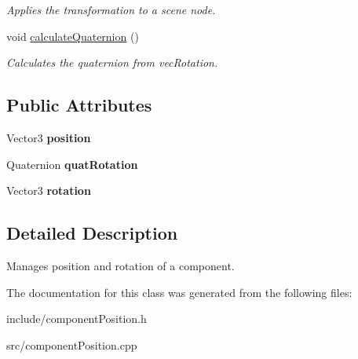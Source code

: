 \begin{DoxyCompactItemize}
\begin{DoxyCompactList}\small\item\em \-Applies the transformation to a scene node. \end{DoxyCompactList}\item 
\hypertarget{classComponentPosition_a76ad8432d80c73989f2fbb2df37777fc}{
void \hyperlink{classComponentPosition_a76ad8432d80c73989f2fbb2df37777fc}{calculate\-Quaternion} ()}
\label{d3/dbe/classComponentPosition_a76ad8432d80c73989f2fbb2df37777fc}

\begin{DoxyCompactList}\small\item\em \-Calculates the quaternion from vec\-Rotation. \end{DoxyCompactList}\end{DoxyCompactItemize}
\subsection*{\-Public \-Attributes}
\begin{DoxyCompactItemize}
\item 
\hypertarget{classComponentPosition_ae77f5516d6f620d89073689b21156b65}{
\-Vector3 {\bfseries position}}
\label{d3/dbe/classComponentPosition_ae77f5516d6f620d89073689b21156b65}

\item 
\hypertarget{classComponentPosition_a944964a54f7842fd674226946937cf84}{
\-Quaternion {\bfseries quat\-Rotation}}
\label{d3/dbe/classComponentPosition_a944964a54f7842fd674226946937cf84}

\item 
\hypertarget{classComponentPosition_a31f498aacb6130adef3a97aa6e3320e5}{
\-Vector3 {\bfseries rotation}}
\label{d3/dbe/classComponentPosition_a31f498aacb6130adef3a97aa6e3320e5}

\end{DoxyCompactItemize}


\subsection{\-Detailed \-Description}
\-Manages position and rotation of a component. 

\-The documentation for this class was generated from the following files\-:\begin{DoxyCompactItemize}
\item 
include/component\-Position.\-h\item 
src/component\-Position.\-cpp\end{DoxyCompactItemize}
